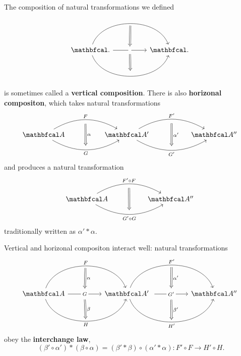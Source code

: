 \documentclass[11pt,a4paper]{article}
\begin{document}
The composition of natural transformations we defined
\begin{equation*}
\begin{tikzcd}
    \cat{.}
    \arrow[rr, bend left=70, ""{name=F}]
    \arrow{rr}[name=G, description]{}
    \arrow[rr, bend right=70, ""{name=H}]
    && \cat{.} \
    \arrow[Rightarrow, from=F, to=G, "", shorten <= 3pt, shorten >= 3pt]
    \arrow[Leftarrow, from=H, to=G, "", shorten <= 3pt, shorten >= 3pt]
\end{tikzcd}
\end{equation*}
is sometimes called a \textbf{vertical composition}. There is also \textbf{horizonal compositon}, which takes natural transformations
\begin{equation*}
\begin{tikzcd}
    \cat{A}
    \arrow[rr, bend left=30, "F"{name=F}]
    \arrow[rr, bend right=30, "G"'{name=G}]
    && \cat{A'} \
    \arrow[from=F, Rightarrow, to=G, "\alpha", shorten <= 6pt, shorten >= 6pt]
    \arrow[rr, bend left=30, "F'"{name=F'}]
    \arrow[rr, bend right=30, "G'"'{name=G'}]
    && \cat{A''} \
    \arrow[from=F', Rightarrow, to=G', "\alpha'", shorten <= 6pt, shorten >= 6pt]
\end{tikzcd}
\end{equation*}
and produces a natural transformation
\begin{equation*}
\begin{tikzcd}
    \cat{A}
    \arrow[rr, bend left=30, "F'\circ F"{name=F}]
    \arrow[rr, bend right=30, "G'\circ G"'{name=G}]
    && \cat{A''} \
    \arrow[from=F, Rightarrow, to=G, "", shorten <= 6pt, shorten >= 6pt]
\end{tikzcd}
\end{equation*}
traditionally written as $\alpha' * \alpha$.\par

Vertical and horizonal compositon interact well: natural transformations
\begin{equation*}
\begin{tikzcd}
    \cat{A}
    \arrow[rr, bend left=70, "F"{name=F}]
    \arrow{rr}[name=G, description]{G}
    \arrow[rr, bend right=70, "H"'{name=H}]
    && \cat{A'} \
    \arrow[rr, bend left=70, "F'"{name=F'}]
    \arrow{rr}[name=G', description]{G'}
    \arrow[rr, bend right=70, "H'"'{name=H'}]
    \arrow[Rightarrow, from=F, to=G, "\alpha", shorten <= 3pt, shorten >= 3pt]
    \arrow[Leftarrow, from=H, to=G, "\beta"', shorten <= 3pt, shorten >= 3pt]
    && \cat{A''} \
    \arrow[Rightarrow, from=F', to=G', "\alpha'", shorten <= 3pt, shorten >= 3pt]
    \arrow[Leftarrow, from=H', to=G', "\beta'"', shorten <= 3pt, shorten >= 3pt]
\end{tikzcd}
\end{equation*}
obey the \textbf{interchange law},
\begin{equation*}
    (\beta'\circ\alpha') * (\beta\circ\alpha) = (\beta'*\beta)\circ(\alpha'*\alpha): F'\circ F\to H'\circ H.
\end{equation*}
\end{document}
